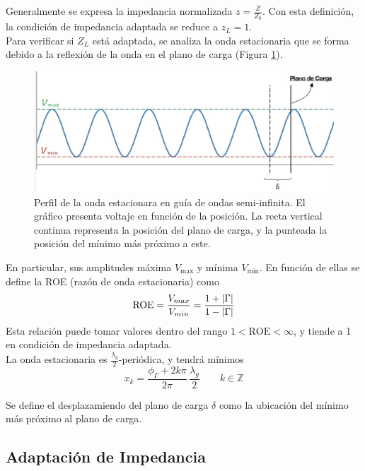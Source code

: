 \documentclass[11pt,a4paper]{article}
\DeclarePairedDelimiter\abs{\lvert}{\rvert}%
\begin{document}
\begin{multicols}{2}
Generalmente se expresa la impedancia normalizada $z=\frac{Z}{Z_0}$. Con esta definición, la condición de impedancia adaptada se reduce a $z_L=1$.\\


Para verificar si $Z_L$ está adaptada, se analiza la onda estacionaria que se forma debido a la reflexión de la onda en el plano de carga (Figura \ref{fig:onda}). 
\begin{figure}[H]
    \centering
    \includegraphics[width=0.9\linewidth]{Images/onda vmax.jpg}
    \caption{Perfil de la onda estacionara en guía de ondas semi-infinita. El gráfico presenta voltaje en función de la posición. La recta vertical continua representa la posición del plano de carga, y la punteada la posición del mínimo más próximo a este.}
    \label{fig:onda}
\end{figure}
En particular, sus amplitudes máxima $V_\text{max}$ y mínima $V_\text{min}$. 
En función de ellas se define la ROE (razón de onda estacionaria) como
\begin{equation}\label{eq:roe}
    \text{ROE} = \frac{V_{max}}{V_{min}} = \frac{1+\abs{\Gamma}}{1-\abs{\Gamma}}
\end{equation}
Esta relación puede tomar valores dentro del rango $1<\text{ROE} < \infty$, y tiende a 1 en condición de impedancia adaptada. \\

La onda estacionaria es $\frac{\lambda_g}{2}$-periódica, y tendrá mínimos 
\begin{equation}
    x_k = \frac{\phi_\Gamma + 2 k\pi}{2\pi} \, \frac{\lambda_g}{2} \qquad  k\in\mathbb{Z}
\end{equation}

Se define el desplazamiendo del plano de carga $\delta$ como la ubicación del mínimo más próximo al plano de carga.\\

\subsection{Adaptación de Impedancia}


\end{multicols}
\end{document}

